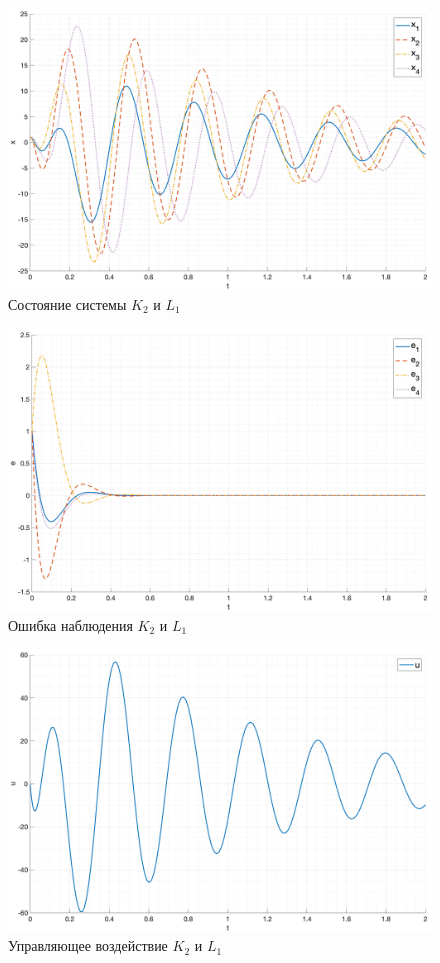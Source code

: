 \begin{figure}[ht!]
    \centering
    \includegraphics[width=\textwidth]{media/plots/task2_3_x.png}
    \caption{Состояние системы $K_2$ и $L_1$}
    \label{fig:task2_2_1_x}
\end{figure}
\begin{figure}[ht!]
    \centering
    \includegraphics[width=\textwidth]{media/plots/task2_3_e.png}
    \caption{Ошибка наблюдения $K_2$ и $L_1$}
    \label{fig:task2_2_1_e}
\end{figure}
\begin{figure}[ht!]
    \centering
    \includegraphics[width=\textwidth]{media/plots/task2_3_u.png}
    \caption{Управляющее воздействие $K_2$ и $L_1$}
    \label{fig:task2_2_1_u}
\end{figure}
